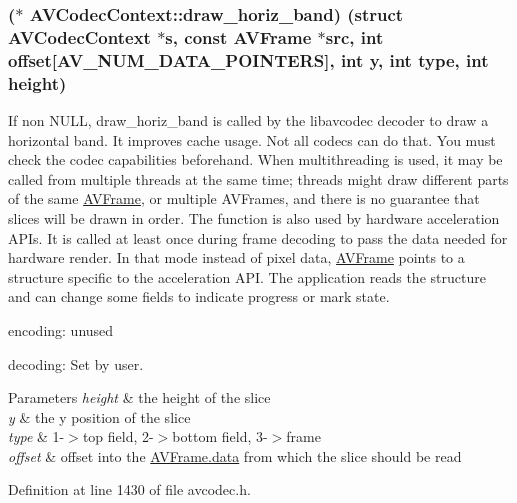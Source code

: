 \subsubsection[{\texorpdfstring{draw\+\_\+horiz\+\_\+band}{draw_horiz_band}}]{($\ast$ A\+V\+Codec\+Context\+::draw\+\_\+horiz\+\_\+band) (struct {\bf A\+V\+Codec\+Context} $\ast${\bf s}, {\bf const} {\bf A\+V\+Frame} $\ast$src, {\bf int} {\bf offset}\mbox{[}{\bf A\+V\+\_\+\+N\+U\+M\+\_\+\+D\+A\+T\+A\+\_\+\+P\+O\+I\+N\+T\+E\+RS}\mbox{]}, {\bf int} y, {\bf int} type, {\bf int} {\bf height})}\hypertarget{struct_a_v_codec_context_a692cb615f8045df330ec0a12852b5252}{}\label{struct_a_v_codec_context_a692cb615f8045df330ec0a12852b5252}
If non N\+U\+LL, \textquotesingle{}draw\+\_\+horiz\+\_\+band\textquotesingle{} is called by the libavcodec decoder to draw a horizontal band. It improves cache usage. Not all codecs can do that. You must check the codec capabilities beforehand. When multithreading is used, it may be called from multiple threads at the same time; threads might draw different parts of the same \hyperlink{struct_a_v_frame}{A\+V\+Frame}, or multiple A\+V\+Frames, and there is no guarantee that slices will be drawn in order. The function is also used by hardware acceleration A\+P\+Is. It is called at least once during frame decoding to pass the data needed for hardware render. In that mode instead of pixel data, \hyperlink{struct_a_v_frame}{A\+V\+Frame} points to a structure specific to the acceleration A\+PI. The application reads the structure and can change some fields to indicate progress or mark state.
\begin{DoxyItemize}
\item encoding\+: unused
\item decoding\+: Set by user. 
\begin{DoxyParams}{Parameters}
{\em height} & the height of the slice \\
\hline
{\em y} & the y position of the slice \\
\hline
{\em type} & 1-\/$>$top field, 2-\/$>$bottom field, 3-\/$>$frame \\
\hline
{\em offset} & offset into the \hyperlink{struct_a_v_frame_a1d0f65014a8d1bf78cec8cbed2304992}{A\+V\+Frame.\+data} from which the slice should be read \\
\hline
\end{DoxyParams}

\end{DoxyItemize}

Definition at line 1430 of file avcodec.\+h.

